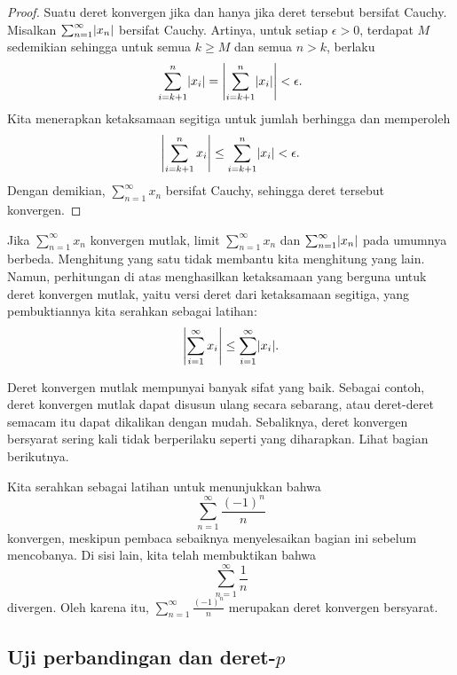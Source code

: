 \begin{proof}
Suatu deret konvergen jika dan hanya jika deret tersebut bersifat Cauchy.
Misalkan $\sum_{n=1}^\infty \lvert {x_n} \rvert$ bersifat Cauchy.  Artinya, untuk setiap $\epsilon > 0$,
terdapat $M$ sedemikian sehingga untuk semua $k \geq M$ dan semua $n > k$, berlaku 
\begin{equation*}
\sum_{i=k+1}^n \lvert {x_i} \rvert 
=
\left\lvert { \sum_{i=k+1}^n \lvert {x_i} \rvert } \right\rvert
<
\epsilon .
\end{equation*}
Kita menerapkan ketaksamaan segitiga untuk jumlah berhingga dan memperoleh
\begin{equation*}
\left\lvert { \sum_{i=k+1}^n x_i } \right\rvert
\leq
\sum_{i=k+1}^n \lvert {x_i} \rvert
<
\epsilon .
\end{equation*}
Dengan demikian, $\sum_{n=1}^\infty x_n$ bersifat Cauchy, sehingga deret tersebut konvergen.
\end{proof}

Jika $\sum_{n=1}^\infty x_n$ konvergen mutlak, limit
$\sum_{n=1}^\infty x_n$ dan $\sum_{n=1}^\infty \lvert {x_n} \rvert$ pada umumnya berbeda.  Menghitung yang satu
tidak membantu kita menghitung yang lain.  Namun, perhitungan di atas menghasilkan
ketaksamaan yang berguna untuk deret konvergen mutlak,
yaitu versi deret dari ketaksamaan segitiga,
yang pembuktiannya kita serahkan sebagai latihan:
\begin{equation*}
\left\lvert { \sum_{i=1}^\infty x_i } \right\rvert
\leq
\sum_{i=1}^\infty \lvert {x_i} \rvert .
\end{equation*}

Deret konvergen mutlak mempunyai banyak sifat yang baik.
Sebagai contoh, deret konvergen mutlak
dapat disusun ulang secara sebarang, atau deret-deret semacam itu dapat
dikalikan dengan mudah.  Sebaliknya, deret konvergen bersyarat
sering kali tidak berperilaku seperti yang diharapkan.  Lihat bagian berikutnya.

Kita serahkan sebagai latihan untuk menunjukkan bahwa
\begin{equation*}
\sum_{n=1}^\infty \frac{{(-1)}^n}{n}
\end{equation*}
konvergen, meskipun pembaca sebaiknya menyelesaikan bagian ini sebelum mencobanya.
Di sisi lain, kita telah membuktikan bahwa
\begin{equation*}
\sum_{n=1}^\infty \frac{1}{n}
\end{equation*}
divergen.  Oleh karena itu,
$\sum_{n=1}^\infty \frac{{(-1)}^n}{n}$ merupakan deret konvergen bersyarat.

\subsection{Uji perbandingan dan deret-\texorpdfstring{$p$}{p}}

